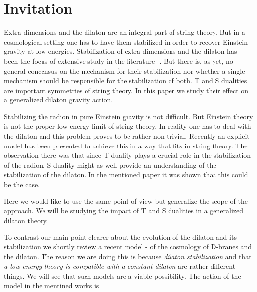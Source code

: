 \documentclass[aps,floatfix,twocolumn,amsmath]{revtex4}
\begin{document}

\maketitle


\section{Invitation}

Extra dimensions and the dilaton are an integral part of string theory. But in a cosmological setting one has to have them stabilized in order to recover Einstein gravity at low energies. Stabilization of extra dimensions and the dilaton has been the focus of extensive study in the literature \cite{a0}-\cite{d4}. But there is, as yet, no general concensus on the mechanism for their stabilization nor whether a single mechanism should be responsible for the stabilization of both. T and S dualities are important symmetries of string theory. In this paper we study their effect on a generalized dilaton gravity action.

Stabilizing the radion in pure Einstein gravity is not difficult. But Einstein theory is not the proper low energy limit of string theory. In reality one has to deal with the dilaton and this problem proves to be rather non-trivial. Recently an explicit model has
been presented \cite{newtr} to achieve this in a way that fits in string theory. The observation there was that since T duality plays a crucial role
in the stabilization of the radion, S duality might as well provide an understanding of the stabilization of the dilaton. In the mentioned paper it was shown that this could be the case.

Here we would like to use the same point of view but generalize the scope of the approach. We will be studying the impact of T and S dualities in a generalized dilaton theory.  

To contrast our main point clearer about the evolution of the dilaton and its stabilization we shortly review a recent
model \cite{tr3}-\cite{tr5} of the cosmology of D-branes and the dilaton. The reason we are doing this is because {\em dilaton stabilization} and that {\em a low energy theory is compatible with a constant dilaton} are rather different things. We will see that such models are a viable possibility. The action of the model in the mentined works is
\end{document}
